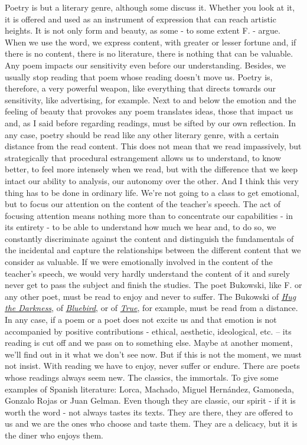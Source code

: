 \documentclass[]{book}
\begin{document}
Poetry is but a literary genre, although some discuss it. Whether you look at it, it is offered and used as an instrument of expression that can reach artistic heights. It is not only form and beauty, as some - to some extent F. - argue. When we use the word, we express content, with greater or lesser fortune and, if there is no content, there is no literature, there is nothing that can be valuable. Any poem impacts our sensitivity even before our understanding. Besides, we usually stop reading that poem whose reading doesn't move us. Poetry is, therefore, a very powerful weapon, like everything that directs towards our sensitivity, like advertising, for example. Next to and below the emotion and the feeling of beauty that provokes any poem translates ideas, those that impact us and, as I said before regarding readings, must be sifted by our own reflection. In any case, poetry should be read like any other literary genre, with a certain distance from the read content. This does not mean that we read impassively, but strategically that procedural estrangement allows us to understand, to know better, to feel more intensely when we read, but with the difference that we keep intact our ability to analysis, our autonomy over the other. And I think this very thing has to be done in ordinary life. We're not going to a class to get emotional, but to focus our attention on the content of the teacher's speech. The act of focusing attention means nothing more than to concentrate our capabilities - in its entirety - to be able to understand how much we hear and, to do so, we constantly discriminate against the content and distinguish the fundamentals of the incidental and capture the relationships between the different content that we consider as valuable. If we were emotionally involved in the content of the teacher's speech, we would very hardly understand the content of it and surely never get to pass the subject and finish the studies. The poet Bukowski, like F. or any other poet, must be read to enjoy and never to suffer. The Bukowski of \href{https://genius.com/Charles-bukowski-hug-the-dark-annotated}{\emph{Hug the Darkness}}, of \href{https://medium.com/poem-of-the-day/charles-bukowski-bluebird-f4e80e5000ef}{\emph{Bluebird}}, or of \href{https://www.poeticous.com/charles-bukowski/true}{\emph{True}}, for example, must be read from a distance. In any case, if a poem or a poet does not excite us and that emotion is not accompanied by positive contributions - ethical, aesthetic, ideological, etc. -- its reading is cut off and we pass on to something else. Maybe at another moment, we'll find out in it what we don't see now. But if this is not the moment, we must not insist. With reading we have to enjoy, never suffer or endure. There are poets whose readings always seem new. The classics, the immortals. To give some examples of Spanish literature: Lorca, Machado, Miguel Hernández, Gamoneda, Gonzalo Rojas or Juan Gelman. Even though they are classic, our spirit - if it is worth the word - not always tastes its texts. They are there, they are offered to us and we are the ones who choose and taste them. They are a delicacy, but it is the diner who enjoys them.
\end{document}
